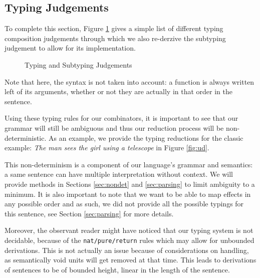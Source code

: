 \subsection{Typing Judgements}\label{subsec:judgements}
To complete this section, Figure \ref{tab:judgements} gives a simple list of different typing composition judgements through which we also re-derzive the subtyping judgement to allow for its implementation.
\begin{figure}
	\caption{Typing and Subtyping Judgements}
	\label{tab:judgements}
\end{figure}

Note that here, the syntax is not taken into account: a function is always written left of its arguments, whether or not they are actually in that order in the sentence.

\medskip

Using these typing rules for our combinators, it is important to see that our grammar will still be ambiguous and thus our reduction process will be non-deterministic.
As an example, we provide the typing reductions for the classic example: \textsl{The man sees the girl using a telescope} in Figure \ref{fig:ud}.

\begin{figure*}
	\centering
	\caption{Parsing trees for the typing of \textsl{The man sees the girl using a telescope}.}
	\label{fig:ud}
\end{figure*}

This non-determinism is a component of our language's grammar and semantics:
a same sentence can have multiple interpretation without context.
We will provide methods in Sections \ref{sec:nondet} and \ref{sec:parsing} to
limit ambiguity to a minimum.
It is also important to note that we want to be able to map effects in any
possible order and as such, we did not provide all the possible typings for
this sentence, see Section \ref{sec:parsing} for more details.

Moreover, the observant reader might have noticed that our typing system is not
decidable, because of the \texttt{nat/pure/return} rules which may allow for
unbounded derivations.
This is not actually an issue because of considerations on handling, as
semantically void units will get removed at that time.
This leads to derivations of sentences to be of bounded height, linear in the
length of the sentence.
